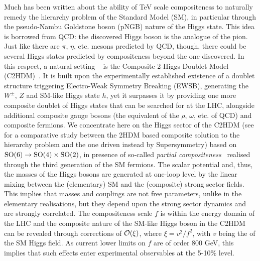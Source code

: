 Much has been written about the ability of TeV scale compositeness to naturally remedy the hierarchy problem of the Standard Model (SM),  in particular through the pseudo-Nambu Goldstone  boson (pNGB) nature of the Higgs state. This idea is borrowed from QCD: the discovered Higgs boson is the analogue of the pion.  Just like there are $\pi$, $\eta$, etc. mesons predicted by QCD, though, there could be several Higgs states predicted by compositeness beyond the one discovered. In this respect, a natural setting ~\cite{Mrazek:2011iu}   is the Composite 2-Higgs Doublet Model (C2HDM)~\cite{DeCurtis:2016scv,DeCurtis:2016tsm,DeCurtis:2017gzi}. It is built upon the experimentally established existence of a doublet structure triggering Electro-Weak Symmetry Breaking (EWSB),  generating the $W^\pm$, $Z$ and SM-like Higgs state $h$, yet it surpasses it by providing one more composite doublet of Higgs states that can be searched for at the LHC, alongside additional composite gauge bosons (the equivalent of the $\rho$, $\omega$, etc. of QCD) and 
composite fermions. We concentrate here on the Higgs sector of the C2HDM (see  for a comparative study between the 2HDM based composite solution to the hierarchy problem and the one driven instead by Supersymmetry)    based on ${\rm SO}(6)\to {\rm SO}(4)\times {\rm SO}(2)$,  in presence of so-called {\sl partial compositeness}~\cite{Kaplan:1991dc} realised through the third generation of the SM fermions.  The scalar potential and, thus, the masses of the Higgs bosons are generated at one-loop level by the linear mixing between the (elementary) SM and the (composite) strong sector fields. This implies that masses and couplings are not free parameters, unlike in the elementary realisations, but they depend upon the strong sector dynamics  and are strongly correlated.
The compositeness scale $f$ is  within the energy domain of the LHC and  the composite nature of the SM-like Higgs boson in the C2HDM can  be revealed through corrections of ${\cal O}(\xi)$, where $\xi=v^2/f^2$, with $v$ being the \vev of the SM Higgs field. 
As current lower limits on $f$ are of order 800 GeV, this implies that such effects enter experimental observables at the 5-10\% level.
